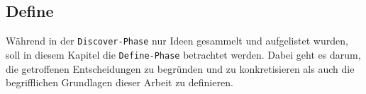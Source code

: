 \begin{newpage}
  \section{Define}
  \label{sec:define}
    Während in der \texttt{Discover-Phase} nur Ideen gesammelt und aufgelistet wurden, soll in diesem Kapitel die \texttt{Define-Phase} betrachtet werden. Dabei geht es darum, die getroffenen Entscheidungen zu begründen und zu konkretisieren als auch die begrifflichen Grundlagen dieser Arbeit zu definieren.
    
    
    
    
    
    
    
\end{newpage}